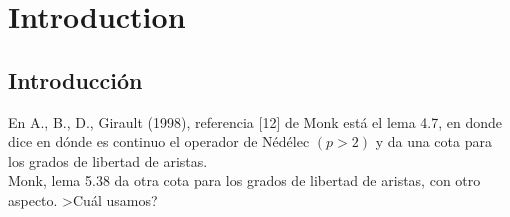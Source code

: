 \chapter{Introduction}
\section{Introducci\'on} %
\label{sec:intro}
En A., B., D., Girault (1998), referencia [12] de Monk est\'a el
lema 4.7, en donde dice en d\'onde es continuo el operador de N\'ed\'elec $(p>2)$ y
da una cota para los grados de libertad de aristas.\\[5pt]
Monk, lema 5.38 da otra cota para los grados de libertad de aristas, con otro aspecto.
>Cu\'al usamos?
